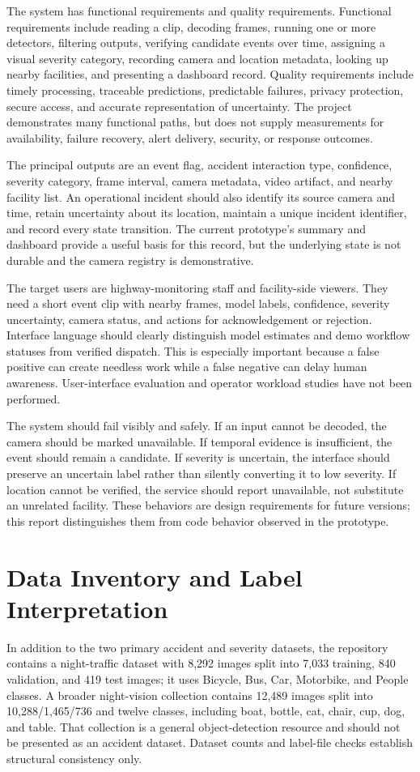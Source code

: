 \documentclass[12pt,a4paper]{article}
\begin{document}
The system has functional requirements and quality requirements. Functional requirements include reading a clip, decoding frames, running one or more detectors, filtering outputs, verifying candidate events over time, assigning a visual severity category, recording camera and location metadata, looking up nearby facilities, and presenting a dashboard record. Quality requirements include timely processing, traceable predictions, predictable failures, privacy protection, secure access, and accurate representation of uncertainty. The project demonstrates many functional paths, but does not supply measurements for availability, failure recovery, alert delivery, security, or response outcomes.

The principal outputs are an event flag, accident interaction type, confidence, severity category, frame interval, camera metadata, video artifact, and nearby facility list. An operational incident should also identify its source camera and time, retain uncertainty about its location, maintain a unique incident identifier, and record every state transition. The current prototype's summary and dashboard provide a useful basis for this record, but the underlying state is not durable and the camera registry is demonstrative.

The target users are highway-monitoring staff and facility-side viewers. They need a short event clip with nearby frames, model labels, confidence, severity uncertainty, camera status, and actions for acknowledgement or rejection. Interface language should clearly distinguish model estimates and demo workflow statuses from verified dispatch. This is especially important because a false positive can create needless work while a false negative can delay human awareness. User-interface evaluation and operator workload studies have not been performed.

The system should fail visibly and safely. If an input cannot be decoded, the camera should be marked unavailable. If temporal evidence is insufficient, the event should remain a candidate. If severity is uncertain, the interface should preserve an uncertain label rather than silently converting it to low severity. If location cannot be verified, the service should report unavailable, not substitute an unrelated facility. These behaviors are design requirements for future versions; this report distinguishes them from code behavior observed in the prototype.

\section{Data Inventory and Label Interpretation}
In addition to the two primary accident and severity datasets, the repository contains a night-traffic dataset with 8,292 images split into 7,033 training, 840 validation, and 419 test images; it uses Bicycle, Bus, Car, Motorbike, and People classes. A broader night-vision collection contains 12,489 images split into 10,288/1,465/736 and twelve classes, including boat, bottle, cat, chair, cup, dog, and table. That collection is a general object-detection resource and should not be presented as an accident dataset. Dataset counts and label-file checks establish structural consistency only.
\end{document}
